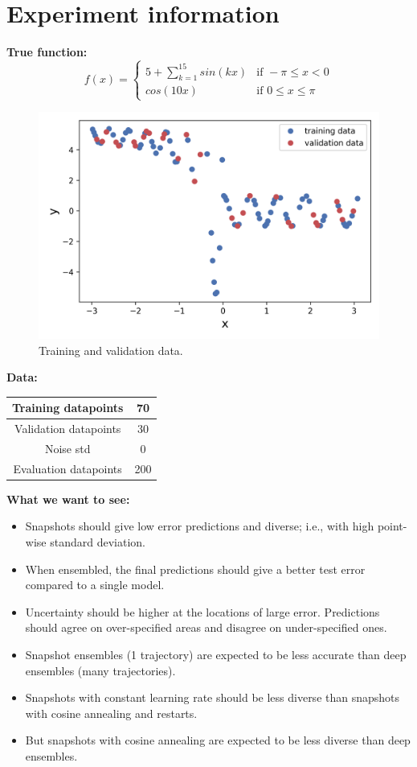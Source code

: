 \section{Experiment information}
\noindent
\textbf{True function:}
\begin{equation}
f(x) = 
\begin{cases} 
5 + \sum_{k = 1}^{15} sin(kx) &\text{if } - \pi \leq x < 0\\
cos(10x) & \text{if } 0 \leq x \leq \pi
\end{cases}
\end{equation}
\begin{figure}[H]
	\centering
	\includegraphics[width=.7\linewidth]{./figs/datapoints.png}  
	\caption{Training and validation data.}
	\label{}
\end{figure}

\noindent
\textbf{Data:}
\begin{center}
	\begin{tabular}{ | c || c |} 
		\hline
		Training datapoints & 70 \\
		\hline
		Validation datapoints & 30 \\
		\hline
		Noise std & 0 \\
		\hline
		Evaluation datapoints & 200 \\
		\hline
	\end{tabular}
\end{center}


\noindent
\textbf{What we want to see:}
\begin{itemize}
	\item Snapshots should give low error predictions and diverse; i.e., with high point-wise standard deviation.
	\item When ensembled, the final predictions should give a better test error compared to a single model.
	\item Uncertainty should be higher at the locations of large error. Predictions should agree on over-specified areas and disagree on under-specified ones.
	\item Snapshot ensembles (1 trajectory) are expected to be less accurate than deep ensembles (many trajectories). 
	\item Snapshots with constant learning rate should be less diverse than snapshots with cosine annealing and restarts.
	\item But snapshots with cosine annealing are expected to be less diverse than deep ensembles.	
\end{itemize}

